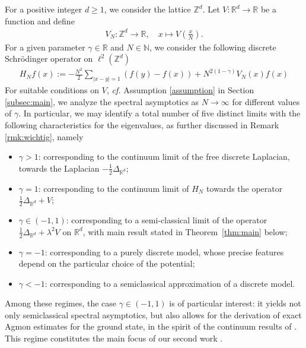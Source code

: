 \documentclass[12pt, reqno]{amsart}
\theoremstyle{definition}
\numberwithin{equation}{section}
\newcommand{\Z}{{\mathbb Z}}
\newcommand{\R}{{\mathbb R}}
\newcommand{\N}{{\mathbb N}}
\begin{document}
For a positive integer $d\geq 1$, we consider the lattice $\Z^d$.  Let $V:\R^d\to \R$ be a function  and  define
\begin{align*}%
V_N:\Z^d\to \R,\quad  x\mapsto V\left(\frac{x}{N}\right).
\end{align*}
For a given parameter $\gamma\in \mathbb{R}$ and $N\in\N$, we consider the following discrete Schr\"{o}dinger operator on $\ell^2(\Z^d)$ 
\begin{align*}%
H_Nf(x):=-\frac{N^2}{2}\sum_{|x-y|=1}(f(y)-f(x))+N^{2(1-\gamma)}V_N(x)f(x)
\end{align*}
For suitable conditions on $V$, \textit{cf.} Assumption \ref{assumption} in Section \ref{subsec:main}, we analyze the spectral asymptotics as $N\to\infty$ for different values of $\gamma$. 
In particular, we may identify a total number of five distinct limits with the following characteristics for the eigenvalues, as further discussed in Remark \ref{rmk:wichtig}, namely
\begin{itemize}
    \item $\gamma> 1$: corresponding to the continuum limit of the free discrete Laplacian, towards the Laplacian $-\frac{1}{2}\Delta_{\mathbb{R}^d}$;
    \item $\gamma=1$: corresponding to the continuum limit of $H_N$ towards the operator $ \frac{1}{2}\Delta_{\mathbb{R}^d}+V$;
    \item $\gamma\in (-1,1)$: corresponding to a semi-classical limit of the operator  $\frac{1}{2}\Delta_{\mathbb{R}^d}+\lambda^2 V$ on $\mathbb{R}^d$, with main result stated in Theorem~\ref{thm:main} below; 
    \item $\gamma=-1$: corresponding to a purely discrete model, whose precise features depend on the particular choice of the potential;
    \item $\gamma<-1$: corresponding to a semiclassical approximation of a discrete model.
\end{itemize}
Among these regimes, the case $\gamma\in(-1,1)$ is of particular interest: it yields not only semiclassical spectral asymptotics, but also allows for the derivation of exact Agmon estimates for the ground state, in the spirit of the continuum results of \cite{Simon_1984}. This regime constitutes the main focus of our second work \cite{Keller_Pettinari_Ven_Part2}.
 
\end{document}
